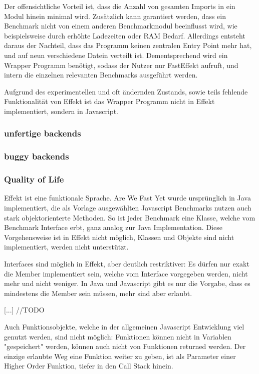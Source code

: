 Der offensichtliche Vorteil ist, dass die Anzahl von gesamten Imports in ein Modul hinein minimal wird. Zusätzlich kann garantiert werden, dass ein Benchmark nicht von einem anderen Benchmarkmodul beeinflusst wird, 
wie beispielsweise durch erhöhte Ladezeiten oder RAM Bedarf. 
Allerdings entsteht daraus der Nachteil, dass das Programm keinen zentralen Entry Point mehr hat, und auf neun verschiedene Datein verteilt ist. Dementsprechend wird ein 
Wrapper Programm benötigt, sodass der Nutzer nur FastEffekt aufruft, und intern die einzelnen relevanten Benchmarks ausgeführt werden.

Aufgrund des experimentellen und oft ändernden Zustands, sowie teils fehlende Funktionalität von Effekt ist das Wrapper Programm nicht in Effekt implementiert, sondern in Javascript.

\subsubsection{unfertige backends}

\subsubsection{buggy backends}



\subsubsection{ Quality of Life }
Effekt ist eine funktionale Sprache. Are We Fast Yet wurde ursprünglich in Java implementiert, die als Vorlage ausgewählten Javascript Benchmarks nutzen auch stark objektorienterte Methoden.
So ist jeder Benchmark eine Klasse, welche vom Benchmark Interface erbt, ganz analog zur Java Implementation.
Diese Vorgehensweise ist in Effekt nicht möglich, Klassen und Objekte sind nicht implementiert, werden nicht unterstützt.

Interfaces sind möglich in Effekt, aber deutlich restriktiver: Es dürfen nur exakt die Member implementiert sein, welche vom Interface vorgegeben werden, nicht mehr und nicht weniger.
In Java und Javascript gibt es nur die Vorgabe, dass es mindestens die Member sein müssen, mehr sind aber erlaubt.

[...] //TODO


Auch Funktionsobjekte, welche in der allgemeinen Javascript Entwicklung viel genutzt werden, sind nicht möglich: Funktionen können nicht in Variablen "gespeichert" werden, können auch nicht von Funktionen returned werden.
Der einzige erlaubte Weg eine Funktion weiter zu geben, ist als Parameter einer Higher Order Funktion, tiefer in den Call Stack hinein.




